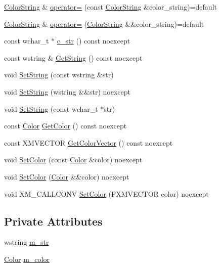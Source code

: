 \begin{DoxyCompactItemize}
\item 
\hyperlink{structmage_1_1_color_string}{Color\+String} \& \hyperlink{structmage_1_1_color_string_a568fed43403422ecafdf92d04e11c4e5}{operator=} (const \hyperlink{structmage_1_1_color_string}{Color\+String} \&color\+\_\+string)=default
\item 
\hyperlink{structmage_1_1_color_string}{Color\+String} \& \hyperlink{structmage_1_1_color_string_a2016416ce91bb7e94a8869201db47ef1}{operator=} (\hyperlink{structmage_1_1_color_string}{Color\+String} \&\&color\+\_\+string)=default
\item 
const wchar\+\_\+t $\ast$ \hyperlink{structmage_1_1_color_string_af2241b81cac59051e9ebf0ddefe719ed}{c\+\_\+str} () const noexcept
\item 
const wstring \& \hyperlink{structmage_1_1_color_string_aee22268a2fe552320299dfa5ac5a93e1}{Get\+String} () const noexcept
\item 
void \hyperlink{structmage_1_1_color_string_aa5ec8bb8e44683ed8a88534f04639930}{Set\+String} (const wstring \&str)
\item 
void \hyperlink{structmage_1_1_color_string_a62a374668fafc55281b97e6374027b25}{Set\+String} (wstring \&\&str) noexcept
\item 
void \hyperlink{structmage_1_1_color_string_a317caadad725b67ede68f1e474e47d3b}{Set\+String} (const wchar\+\_\+t $\ast$str)
\item 
const \hyperlink{structmage_1_1_color}{Color} \hyperlink{structmage_1_1_color_string_afba86162d9c13d76dcdb9cf232e8e89f}{Get\+Color} () const noexcept
\item 
const X\+M\+V\+E\+C\+T\+OR \hyperlink{structmage_1_1_color_string_a9326950147ecdc3c09909518e0dddb76}{Get\+Color\+Vector} () const noexcept
\item 
void \hyperlink{structmage_1_1_color_string_acff8b67574e427674e6abb98da7cca3a}{Set\+Color} (const \hyperlink{structmage_1_1_color}{Color} \&color) noexcept
\item 
void \hyperlink{structmage_1_1_color_string_a45a4a036e48431882c193be5bd718add}{Set\+Color} (\hyperlink{structmage_1_1_color}{Color} \&\&color) noexcept
\item 
void X\+M\+\_\+\+C\+A\+L\+L\+C\+O\+NV \hyperlink{structmage_1_1_color_string_ab4de02b485d18384fcca1a0b55600abd}{Set\+Color} (F\+X\+M\+V\+E\+C\+T\+OR color) noexcept
\end{DoxyCompactItemize}
\subsection*{Private Attributes}
\begin{DoxyCompactItemize}
\item 
wstring \hyperlink{structmage_1_1_color_string_a9eb840afa5112cd611f5bb1b21edc045}{m\+\_\+str}
\item 
\hyperlink{structmage_1_1_color}{Color} \hyperlink{structmage_1_1_color_string_a3f351c61281fc49786bc13842527d2a3}{m\+\_\+color}
\end{DoxyCompactItemize}


